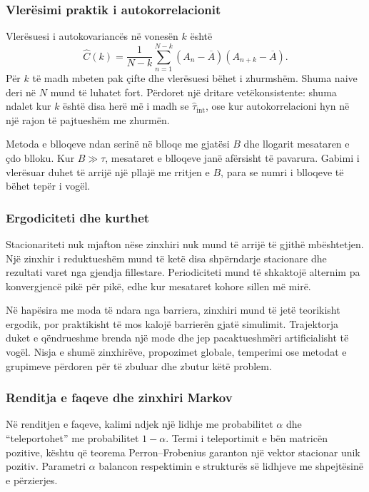 \documentclass[11pt,oneside,openany]{book}
\begin{document}
\subsubsection{Vlerësimi praktik i autokorrelacionit}
Vlerësuesi i autokovariancës në vonesën $k$ është
\begin{equation}
 \widehat C(k)=\frac{1}{N-k}\sum_{n=1}^{N-k}
 (A_n-\overline A)(A_{n+k}-\overline A).
\end{equation}
Për $k$ të madh mbeten pak çifte dhe vlerësuesi bëhet i zhurmshëm. Shuma naive deri në $N$ mund të luhatet fort. Përdoret një dritare vetëkonsistente: shuma ndalet kur $k$ është disa herë më i madh se $\widehat\tau_{\mathrm{int}}$, ose kur autokorrelacioni hyn në një rajon të pajtueshëm me zhurmën.

Metoda e blloqeve ndan serinë në blloqe me gjatësi $B$ dhe llogarit mesataren e çdo blloku. Kur $B\gg\tau$, mesataret e blloqeve janë afërsisht të pavarura. Gabimi i vlerësuar duhet të arrijë një pllajë me rritjen e $B$, para se numri i blloqeve të bëhet tepër i vogël.

\subsubsection{Ergodiciteti dhe kurthet}
Stacionariteti nuk mjafton nëse zinxhiri nuk mund të arrijë të gjithë mbështetjen. Një zinxhir i reduktueshëm mund të ketë disa shpërndarje stacionare dhe rezultati varet nga gjendja fillestare. Periodiciteti mund të shkaktojë alternim pa konvergjencë pikë për pikë, edhe kur mesataret kohore sillen më mirë.

Në hapësira me moda të ndara nga barriera, zinxhiri mund të jetë teorikisht ergodik, por praktikisht të mos kalojë barrierën gjatë simulimit. Trajektorja duket e qëndrueshme brenda një mode dhe jep pacaktueshmëri artificialisht të vogël. Nisja e shumë zinxhirëve, propozimet globale, temperimi ose metodat e grupimeve përdoren për të zbuluar dhe zbutur këtë problem.

\subsubsection{Renditja e faqeve dhe zinxhiri Markov}
Në renditjen e faqeve, kalimi ndjek një lidhje me probabilitet $\alpha$ dhe ``teleportohet'' me probabilitet $1-\alpha$. Termi i teleportimit e bën matricën pozitive, kështu që teorema Perron--Frobenius garanton një vektor stacionar unik pozitiv. Parametri $\alpha$ balancon respektimin e strukturës së lidhjeve me shpejtësinë e përzierjes.
\end{document}

